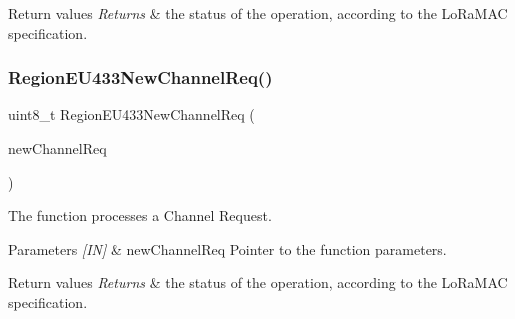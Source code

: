\begin{DoxyRetVals}{Return values}
{\em Returns} & the status of the operation, according to the Lo\+Ra\+M\+AC specification. \\
\hline
\end{DoxyRetVals}
\mbox{\label{group__REGIONEU433_ga1df9d3b633c355a6b1d2b7fc1e0e217b}} 
\subsubsection{\texorpdfstring{Region\+E\+U433\+New\+Channel\+Req()}{RegionEU433NewChannelReq()}}
{\footnotesize\ttfamily uint8\+\_\+t Region\+E\+U433\+New\+Channel\+Req (\begin{DoxyParamCaption}\item[{\hyperlink{group__REGION_gae2abcdb6dbb843c9faf5fd3009eca9d6}{New\+Channel\+Req\+Params\+\_\+t} $\ast$}]{new\+Channel\+Req }\end{DoxyParamCaption})}



The function processes a Channel Request. 


\begin{DoxyParams}{Parameters}
{\em \mbox{[}\+I\+N\mbox{]}} & new\+Channel\+Req Pointer to the function parameters.\\
\hline
\end{DoxyParams}

\begin{DoxyRetVals}{Return values}
{\em Returns} & the status of the operation, according to the Lo\+Ra\+M\+AC specification. \\
\hline
\end{DoxyRetVals}
\mbox{\label{group__REGIONEU433_gacece995005d92767951d5e1b4d513494}} 
